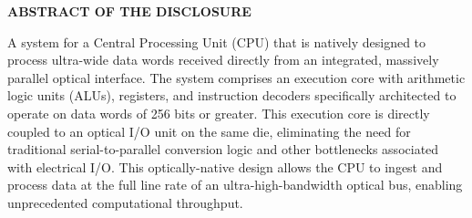 \documentclass[11pt,letterpaper]{article}
\begin{document}
\thispagestyle{empty}

\begin{center}
    \textbf{\large ABSTRACT OF THE DISCLOSURE}
\end{center}

\vspace{0.6cm}

A system for a Central Processing Unit (CPU) that is natively designed to process ultra-wide data words received directly from an integrated, massively parallel optical interface. The system comprises an execution core with arithmetic logic units (ALUs), registers, and instruction decoders specifically architected to operate on data words of 256 bits or greater. This execution core is directly coupled to an optical I/O unit on the same die, eliminating the need for traditional serial-to-parallel conversion logic and other bottlenecks associated with electrical I/O. This optically-native design allows the CPU to ingest and process data at the full line rate of an ultra-high-bandwidth optical bus, enabling unprecedented computational throughput.
\end{document}
